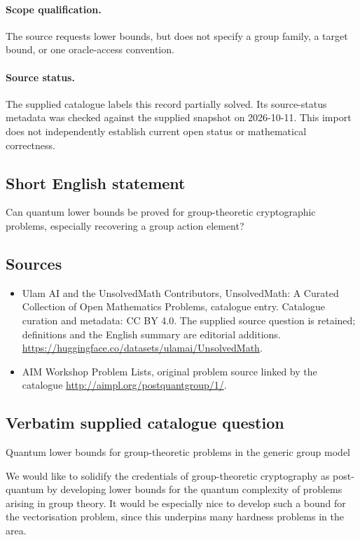 \documentclass[11pt]{article}
\begin{document}
\paragraph{Scope qualification.}
The source requests lower bounds, but does not specify a group family, a target bound, or one oracle-access convention.
\paragraph{Source status.}
The supplied catalogue labels this record partially solved. Its source-status metadata was checked against the supplied snapshot on 2026-10-11. This import does not independently establish current open status or mathematical correctness.
\subsection{Short English statement}
Can quantum lower bounds be proved for group-theoretic cryptographic problems, especially recovering a group action element?
\subsection{Sources}
\begin{itemize}
\item[S1] Ulam AI and the UnsolvedMath Contributors, UnsolvedMath: A Curated Collection of Open Mathematics Problems, catalogue entry. Catalogue curation and metadata: CC BY 4.0. The supplied source question is retained; definitions and the English summary are editorial additions.
\url{https://huggingface.co/datasets/ulamai/UnsolvedMath}.
\item[S2] AIM Workshop Problem Lists, original problem source linked by the catalogue
\url{http://aimpl.org/postquantgroup/1/}.
\end{itemize}
\subsection{Verbatim supplied catalogue question}
Quantum lower bounds for group-theoretic problems in the generic group model

We would like to solidify the credentials of group-theoretic cryptography as post-quantum by developing lower bounds for the quantum complexity of problems arising in group theory. It would be especially nice to develop such a bound for the vectorisation problem, since this underpins many hardness problems in the area.
\end{document}
